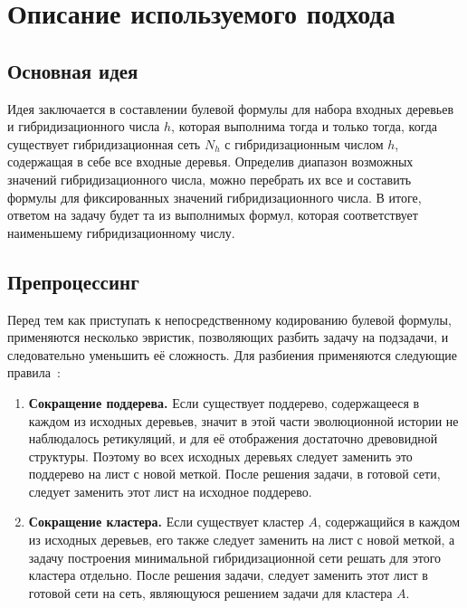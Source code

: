\FloatBarrier
\chapter{Описание используемого подхода}

\FloatBarrier
\section{Основная идея}

Идея заключается в составлении булевой формулы для набора входных деревьев и гибридизационного числа $h$, которая выполнима тогда и только тогда, когда существует гибридизационная сеть $N_h$ с гибридизационным числом $h$, содержащая в себе все входные деревья.
Определив диапазон возможных значений гибридизационного числа, можно перебрать их все и составить формулы для фиксированных значений гибридизационного числа.
В итоге, ответом на задачу будет та из выполнимых формул, которая соответствует наименьшему гибридизационному числу.

\FloatBarrier
\section{Препроцессинг}

Перед тем как приступать к непосредственному кодированию булевой формулы, применяются несколько эвристик, позволяющих разбить задачу на подзадачи, и следовательно уменьшить её сложность.
Для разбиения применяются следующие правила~\cite{bonet2009efficiently}:

\begin{enumerate}
	\item \textbf{Сокращение поддерева.} Если существует поддерево, содержащееся в каждом из исходных деревьев, значит в этой части эволюционной истории не наблюдалось ретикуляций, и для её отображения достаточно древовидной структуры.
	Поэтому во всех исходных деревьях следует заменить это поддерево на лист с новой меткой.
	После решения задачи, в готовой сети, следует заменить этот лист на исходное поддерево.
	\item \textbf{Сокращение кластера.} Если существует кластер $A$, содержащийся в каждом из исходных деревьев, его также следует заменить на лист с новой меткой, а задачу построения минимальной гибридизационной сети решать для этого кластера отдельно.
	После решения задачи, следует заменить этот лист в готовой сети на сеть, являющуюся решением задачи для кластера $A$.
\end{enumerate}

